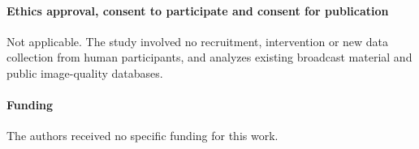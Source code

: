 \documentclass[sn-basic,Numbered]{sn-jnl}
\begin{document}
\paragraph{Ethics approval, consent to participate and consent for publication}
Not applicable. The study involved no recruitment, intervention or new data collection
from human participants, and analyzes existing broadcast material and public image-quality
databases.

\paragraph{Funding}
The authors received no specific funding for this work.


\end{document}
